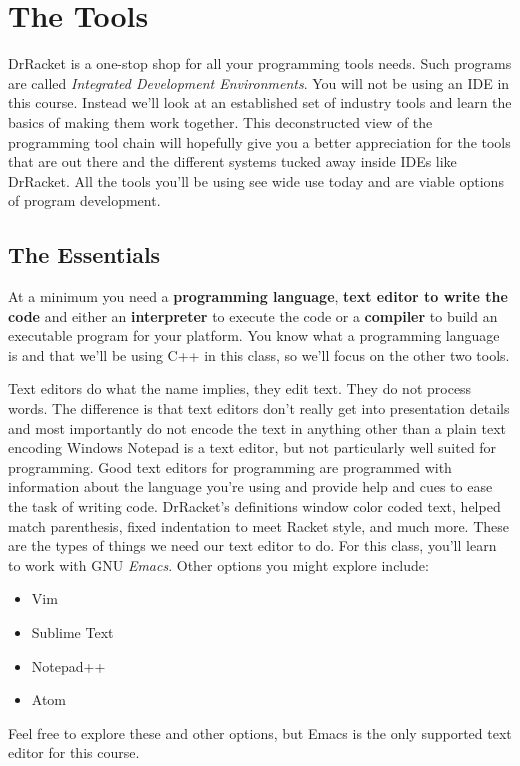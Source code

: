 \documentclass[nobib]{tufte-handout}
\begin{document}
\section{The Tools}

DrRacket is a one-stop shop for all your programming tools needs.  Such programs are called \textit{Integrated Development Environments}. You will not be using an IDE in this course.  Instead we'll look at an established set of industry tools and learn the basics of making them work together.  This deconstructed view of the programming tool chain will hopefully give you a better appreciation for the tools that are out there and the different systems tucked away inside IDEs like DrRacket.  All the tools you'll be using see wide use today and are viable options of program development.

\subsection{The Essentials}

At a minimum you need a \textbf{programming language}, \textbf{text editor to write the code} and either an \textbf{interpreter} to execute the code or a \textbf{compiler} to build an executable program for your platform. You know what a programming language is and that we'll be using C++ in this class, so we'll focus on the other two tools.

Text editors do what the name implies, they edit text. They do not process words. The difference is that text editors don't really get into presentation details and most importantly do not encode the text in anything other than a plain text encoding  Windows Notepad is a text editor, but not particularly well suited for programming. Good text editors for programming are programmed with information about the language you're using and provide help and cues to ease the task of writing code.  DrRacket's definitions window color coded text, helped match parenthesis, fixed indentation to meet Racket style, and much more.  These are the types of things we need our text editor to do. For this class, you'll learn to work with GNU \textit{Emacs}. Other options you might explore include:
\begin{itemize}
\item Vim
\item Sublime Text
\item Notepad++
\item Atom 
\end{itemize}
Feel free to explore these and other options, but Emacs is the only supported text editor for this course.
\end{document}
